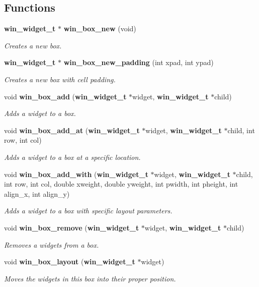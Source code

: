\subsection*{Functions}
\begin{CompactItemize}
\item 
{\bf win\_\-widget\_\-t} $\ast$ {\bf win\_\-box\_\-new} (void)
\begin{CompactList}\small\item\em Creates a new box. \item\end{CompactList}\item 
{\bf win\_\-widget\_\-t} $\ast$ {\bf win\_\-box\_\-new\_\-padding} (int xpad, int ypad)
\begin{CompactList}\small\item\em Creates a new box with cell padding. \item\end{CompactList}\item 
void {\bf win\_\-box\_\-add} ({\bf win\_\-widget\_\-t} $\ast$widget, {\bf win\_\-widget\_\-t} $\ast$child)
\begin{CompactList}\small\item\em Adds a widget to a box. \item\end{CompactList}\item 
void {\bf win\_\-box\_\-add\_\-at} ({\bf win\_\-widget\_\-t} $\ast$widget, {\bf win\_\-widget\_\-t} $\ast$child, int row, int col)
\begin{CompactList}\small\item\em Adds a widget to a box at a specific location. \item\end{CompactList}\item 
void {\bf win\_\-box\_\-add\_\-with} ({\bf win\_\-widget\_\-t} $\ast$widget, {\bf win\_\-widget\_\-t} $\ast$child, int row, int col, double xweight, double yweight, int pwidth, int pheight, int align\_\-x, int align\_\-y)
\begin{CompactList}\small\item\em Adds a widget to a box with specific layout parameters. \item\end{CompactList}\item 
void {\bf win\_\-box\_\-remove} ({\bf win\_\-widget\_\-t} $\ast$widget, {\bf win\_\-widget\_\-t} $\ast$child)
\begin{CompactList}\small\item\em Removes a widgets from a box. \item\end{CompactList}\item 
void {\bf win\_\-box\_\-layout} ({\bf win\_\-widget\_\-t} $\ast$widget)
\begin{CompactList}\small\item\em Moves the widgets in this box into their proper position. \item\end{CompactList}\end{CompactItemize}


